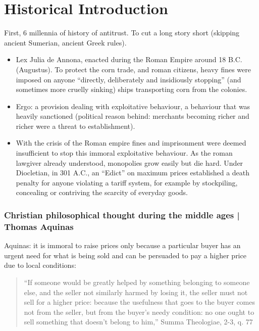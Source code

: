 
\newpage
\section{Historical Introduction}

        First, 6 millennia of history of antitrust. To cut a long story short (skipping ancient Sumerian, ancient Greek rules).
        \begin{itemize}
            \item Lex Julia de Annona, enacted during the Roman Empire around 18 B.C. (Augustus). To protect the corn trade, and roman citizens, heavy fines were imposed on anyone “directly, deliberately and insidiously stopping” (and sometimes more cruelly sinking) ships transporting corn from the colonies. 
            \item Ergo: a provision dealing with exploitative behaviour, a behaviour that was heavily sanctioned (political reason behind: merchants becoming richer and richer were a threat to establishment).  
            \item With the crisis of the Roman empire fines and imprisonment were deemed insufficient to stop this immoral exploitative behaviour. As the roman lawgiver already understood, monopolies grow easily but die hard. Under Diocletian, in 301 A.C., an “Edict” on maximum prices established a death penalty for anyone violating a tariff system, for example by stockpiling, concealing or contriving the scarcity of everyday goods. 
        \end{itemize}

            \subsubsection{Christian philosophical thought during the middle ages | Thomas Aquinas}
                Aquinas: it is immoral to raise prices only because a particular buyer has an urgent need for what is being sold and can be persuaded to pay a higher price due to local conditions:
                \begin{quote}
                    “If someone would be greatly helped by something belonging to someone else, and the seller not similarly harmed by losing it, the seller must not sell for a higher price: because the usefulness that goes to the buyer comes not from the seller, but from the buyer's needy condition: no one ought to sell something that doesn't belong to him,” Summa Theologiae, 2-3, q. 77 
                \end{quote}

